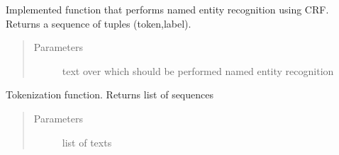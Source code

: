 \documentclass[letterpaper,10pt,english]{sphinxmanual}
\begin{document}
\begin{fulllineitems}
\begin{fulllineitems}
\begin{quote}
\begin{description}
\end{description}\end{quote}

\end{fulllineitems}


\begin{fulllineitems}
\label{\detokenize{index:ner_plugins.NER_CRF.NER_CRF.perform_NER}}
Implemented function that performs named entity recognition using CRF. Returns a sequence of tuples (token,label).
\begin{quote}\begin{description}
\item[{Parameters}] \leavevmode
{} \textendash{} text over which should be performed named entity recognition

\end{description}\end{quote}

\end{fulllineitems}


\begin{fulllineitems}
\label{\detokenize{index:ner_plugins.NER_CRF.NER_CRF.tokenize_fa}}
Tokenization function. Returns list of sequences
\begin{quote}\begin{description}
\item[{Parameters}] \leavevmode
{} \textendash{} list of texts

\end{description}\end{quote}

\end{fulllineitems}



\end{fulllineitems}
\end{document}
